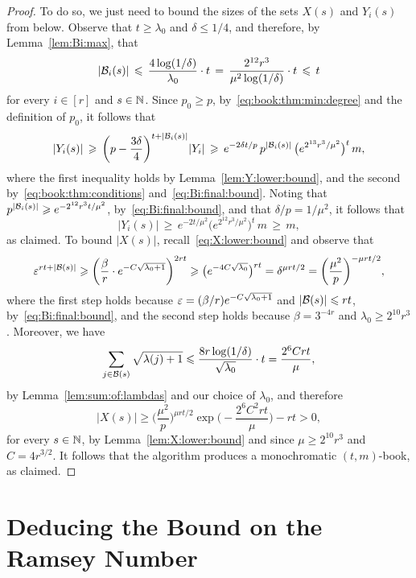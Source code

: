 \begin{proof}
  To do so, we just need to bound the sizes of the sets $X(s)$ and $Y_i(s)$ from below. Observe that $t \ge \lambda_0$ and $\delta \le 1/4$, and therefore, by Lemma~\ref{lem:Bi:max}, that
  \begin{equation}\label{eq:Bi:final:bound}
  |\mathcal{B}_i(s)| \, \leqslant \, \frac{4 \log(1/\delta)}{\lambda_0} \cdot t \, = \, \frac{2^{12} r^3}{\mu^2 \log(1/\delta)} \cdot t \, \leqslant \, t
  \end{equation}
  for every $i \in [r]$ and $s \in \mathbb{N}$. Since $p_0 \ge p$, by~\eqref{eq:book:thm:min:degree} and the definition of $p_0$, it follows that  
  $$|Y_i(s)| \, \geqslant \, \bigg( p - \frac{3\delta}{4} \bigg)^{t + |\mathcal{B}_i(s)|} |Y_i| \, \geqslant \, e^{-2\delta t / p} \, p^{|\mathcal{B}_i(s)|} \, \big( e^{2^{13} r^3 / \mu^2} \big)^t \, m,$$
  where the first inequality holds by Lemma~\ref{lem:Y:lower:bound}, and the second by~\eqref{eq:book:thm:conditions} and~\eqref{eq:Bi:final:bound}. Noting that $p^{|\mathcal{B}_i(s)|} \geqslant e^{-2^{12} r^3 t / \mu^2}$, by~\eqref{eq:Bi:final:bound}, and that $\delta / p = 1/\mu^2$, it follows that 
  $$|Y_i(s)| \, \ge \, e^{-2 t / \mu^2} \big( e^{2^{12} r^3 / \mu^2} \big)^t \, m \, \ge \, m,$$
  as claimed. To bound $|X(s)|$, recall~\eqref{eq:X:lower:bound} and observe that 
  $$\varepsilon^{rt + |\mathcal{B}(s)|}  \geqslant \bigg( \frac{\beta}{r} \cdot e^{- C \sqrt{\lambda_0 + 1}} \bigg)^{2rt} \geqslant \big( e^{- 4C \sqrt{\lambda_0}} \big)^{rt} = \delta^{\mu r t/2} = \bigg( \frac{\mu^2}{p} \bigg)^{-\mu r t / 2},$$
  where the first step holds because $\varepsilon = (\beta / r) e^{- C \sqrt{\lambda_0 + 1}}$ and $|\mathcal{B}(s)| \leqslant rt$, by~\eqref{eq:Bi:final:bound}, and the second step holds because $\beta = 3^{-4r}$ and $\lambda_0 \ge 2^{10} r^3$. Moreover, we have
  $$\sum_{j \in \mathcal{B}(s)} \sqrt{\lambda(j)+1} \leqslant \frac{8r \log(1/\delta)}{\sqrt{\lambda_0}} \cdot t = \frac{2^6Crt}{\mu},$$
  by Lemma~\ref{lem:sum:of:lambdas} and our choice of $\lambda_0$, and therefore 
  $$|X(s)| \ge \bigg( \frac{\mu^2}{p} \bigg)^{\mu r t / 2} \exp\bigg( - \frac{2^6C^2rt}{\mu} \bigg) - rt > 0,$$
  for every $s \in \mathbb{N}$, by Lemma~\ref{lem:X:lower:bound} and since $\mu \ge 2^{10} r^3$ and $C = 4r^{3/2}$. It follows that the algorithm produces a monochromatic $(t,m)$-book, as claimed. 
\end{proof}
  



\section{Deducing the Bound on the Ramsey Number}


